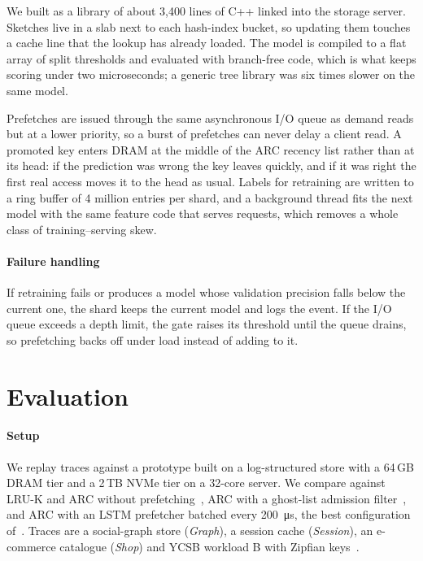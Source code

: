 \documentclass[10pt, twocolumn]{article}
\begin{document}
We built \sys{} as a library of about 3{,}400 lines of C++ linked into the
storage server. Sketches live in a slab next to each hash-index bucket, so
updating them touches a cache line that the lookup has already loaded. The
model is compiled to a flat array of split thresholds and evaluated with
branch-free code, which is what keeps scoring under two microseconds; a
generic tree library was six times slower on the same model.

Prefetches are issued through the same asynchronous I/O queue as demand
reads but at a lower priority, so a burst of prefetches can never delay a
client read. A promoted key enters DRAM at the middle of the ARC recency
list rather than at its head: if the prediction was wrong the key leaves
quickly, and if it was right the first real access moves it to the head as
usual. Labels for retraining are written to a ring buffer of 4 million
entries per shard, and a background thread fits the next model with the
same feature code that serves requests, which removes a whole class of
training--serving skew.

\paragraph{Failure handling}
If retraining fails or produces a model whose validation precision falls
below the current one, the shard keeps the current model and logs the
event. If the I/O queue exceeds a depth limit, the gate raises its
threshold until the queue drains, so prefetching backs off under load
instead of adding to it.

\section{Evaluation}
\label{sec:eval}

\paragraph{Setup}
We replay traces against a prototype built on a log-structured store with a
64\,GB DRAM tier and a 2\,TB NVMe tier on a 32-core server. We compare
against LRU-K and ARC without prefetching~\cite{oneil1993lruk,
megiddo2003arc}, ARC with a ghost-list admission filter~\cite{brandao2024ghost},
and ARC with an LSTM prefetcher batched every \SI{200}{\micro\second}, the
best configuration of~\cite{osei2023prefetch}. Traces are a social-graph
store (\emph{Graph}), a session cache (\emph{Session}), an e-commerce
catalogue (\emph{Shop}) and YCSB workload B with Zipfian keys~\cite{cooper2010ycsb}.
\end{document}
